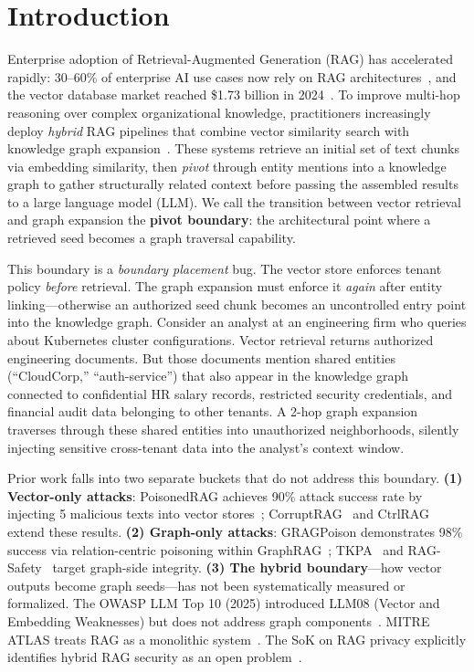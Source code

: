 \documentclass[letterpaper,twocolumn,10pt]{article}
\begin{document}
\section{Introduction}
\label{sec:introduction}

Enterprise adoption of Retrieval-Augmented Generation (RAG) has
accelerated rapidly: 30--60\% of enterprise AI use cases now rely on
RAG architectures~\cite{saferag2025}, and the vector database market
reached \$1.73 billion in 2024~\cite{pineconerac2024}. To improve
multi-hop reasoning over complex organizational knowledge,
practitioners increasingly deploy \emph{hybrid} RAG pipelines that
combine vector similarity search with knowledge graph
expansion~\cite{hybridrag2024, microsoftgraphrag2024}. These systems
retrieve an initial set of text chunks via embedding similarity, then
\emph{pivot} through entity mentions into a knowledge graph to gather
structurally related context before passing the assembled results to a
large language model (LLM). We call the transition between vector
retrieval and graph expansion the \textbf{pivot boundary}: the
architectural point where a retrieved seed becomes a graph traversal
capability.

This boundary is a \emph{boundary placement} bug. The vector store
enforces tenant policy \emph{before} retrieval. The graph expansion
must enforce it \emph{again} after entity linking---otherwise an
authorized seed chunk becomes an uncontrolled entry point into the
knowledge graph. Consider an analyst at an engineering firm who queries
about Kubernetes cluster configurations. Vector retrieval returns
authorized engineering documents. But those documents mention shared
entities (``CloudCorp,'' ``auth-service'') that also appear in the
knowledge graph connected to confidential HR salary records, restricted
security credentials, and financial audit data belonging to other
tenants. A 2-hop graph expansion traverses through these shared entities
into unauthorized neighborhoods, silently injecting sensitive
cross-tenant data into the analyst's context window.

Prior work falls into two separate buckets that do not address this
boundary. \textbf{(1) Vector-only attacks}: PoisonedRAG achieves
90\% attack success rate by injecting 5 malicious texts into vector
stores~\cite{zou2025poisonedrag}; CorruptRAG~\cite{corruptrag2025} and
CtrlRAG~\cite{ctrlrag2025} extend these results.
\textbf{(2) Graph-only attacks}: GRAGPoison demonstrates 98\% success
via relation-centric poisoning within
GraphRAG~\cite{gragpoison2026}; TKPA~\cite{fewwords2025} and
RAG-Safety~\cite{ragsafety2025} target graph-side integrity.
\textbf{(3) The hybrid boundary}---how vector outputs become graph
seeds---has not been systematically measured or formalized. The
OWASP LLM Top 10 (2025) introduced LLM08 (Vector and Embedding
Weaknesses) but does not address graph
components~\cite{owasptop10llm2025}. MITRE ATLAS treats RAG as a
monolithic system~\cite{mitreatlas2025}. The SoK on RAG privacy
explicitly identifies hybrid RAG security as an open
problem~\cite{sokprivacy2026}.
\end{document}
